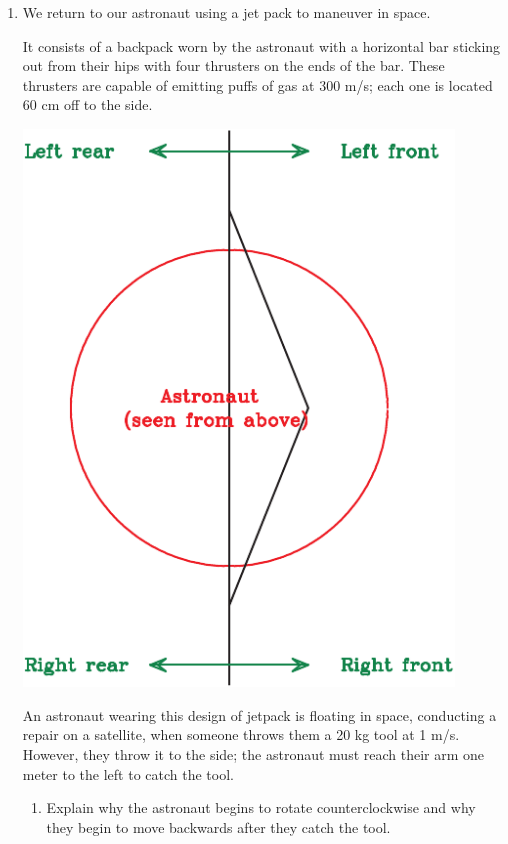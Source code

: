 \documentclass[12pt]{article}
\begin{document}
\begin{enumerate}
\bigskip\bigskip

	\item We return to our astronaut using a jet pack to maneuver in space.
	
	\begin{minipage}{0.6\textwidth}
		It consists of a backpack worn by the astronaut with a horizontal bar sticking out from their hips with four thrusters on the ends of the bar. These thrusters are capable of emitting puffs
of gas at 300 m/s; each one is located 60 cm off to the side.

	\end{minipage}
		\begin{minipage}{0.3\textwidth}
			\includegraphics[width=0.9\textwidth]{jetpack-crop.pdf}
		\end{minipage}

		An astronaut wearing this design of jetpack is floating in space, conducting a repair on a satellite, when someone throws them a 20 kg tool at 1 m/s. However, they throw it to the side; the astronaut must reach 
				their arm one meter to the left to catch the tool. 

				\begin{enumerate}
					\item Explain why the astronaut begins to rotate counterclockwise and why they begin to move backwards after they catch the tool.
					


\end{enumerate}
\end{enumerate}
\end{document}
